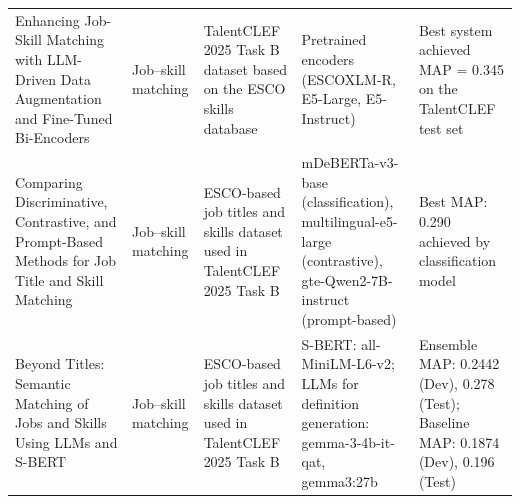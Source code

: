 \documentclass[]{ceurart}
\begin{document}
\begin{table}[ht]
\begin{tabular}{@{}p{3.5cm}p{2.5cm}p{2.8cm}p{3.0cm}p{3.2cm}@{}}
\addlinespace
Enhancing Job-Skill Matching with LLM-Driven Data Augmentation and Fine-Tuned Bi-Encoders~\cite{ali2025jobskill}
  & Job–skill matching
  & TalentCLEF 2025 Task B dataset based on the ESCO skills database
  & Pretrained encoders (ESCOXLM-R, E5-Large, E5-Instruct)
  & Best system achieved MAP = 0.345 on the TalentCLEF test set \\

\addlinespace
Comparing Discriminative, Contrastive, and Prompt-Based Methods for Job Title and Skill Matching
~\cite{zhang2025nlpnorth}
  & Job–skill matching
  & ESCO-based job titles and skills dataset used in TalentCLEF 2025 Task B
  & mDeBERTa-v3-base (classification), multilingual-e5-large (contrastive), gte-Qwen2-7B-instruct (prompt-based)
  & Best MAP: 0.290 achieved by classification model\\

\addlinespace
Beyond Titles: Semantic Matching of Jobs and Skills Using LLMs and S-BERT
~\cite{vazquez2025beyond}
  & Job–skill matching
  & ESCO-based job titles and skills dataset used in TalentCLEF 2025 Task B
  & S-BERT: all-MiniLM-L6-v2; LLMs for definition generation: gemma-3-4b-it-qat, gemma3:27b
  & Ensemble MAP: 0.2442 (Dev), 0.278 (Test); Baseline MAP: 0.1874 (Dev), 0.196 (Test)\\
  
\bottomrule
\end{tabular}
\end{table}




\appendix
\end{document}
